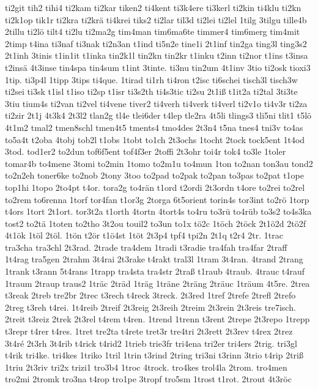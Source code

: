 {ti2git
tih2
tihi4
ti2kam
ti2kar
tiken2
ti4kent
ti3k4ere
ti3kerl
ti2kin
ti4klu
ti2kn
ti2k1op
tik1r
ti2kra
ti2krä
ti4krei
tiks2
ti2lar
til3d
ti2lei
ti2lel
1tilg
3tilgu
tille4b
2tillu
ti2lö
tilt4
ti2lu
ti2ma2g
tim4man
tim6ma6te
timmer4
tim6merg
tim4mit
2timp
t4ina
ti3naf
ti3nak
ti2n3an
t1ind
ti5n2e
tine1i
2t1inf
tin2ga
ting3l
ting3s2
2t1inh
3tinis
t1in1it
t1inka
tin2k1l
tin2kn
tin2kr
t1inku
t2inn
ti2nor
t1ins
t3insa
t2insä
4t3inse
tin4spa
tin4sum
t1int
3tinte.
ti3nu
tin2um
4t1inv
3tio
ti2osk
tioxi3
1tip.
ti3p4l
1tipp
3tips
ti4que.
1tirad
ti1rh
ti4ron
t2isc
ti6schei
tisch3l
tisch3w
ti2sei
ti3sk
t1isl
t1iso
ti2sp
t1isr
ti3s2th
ti4s3tic
ti2su
2t1iß
t1it2a
ti2tal
3ti3te
3tiu
tium4s
ti2van
ti2vel
ti4vene
tiver2
ti4verh
ti4verk
ti4verl
ti2v1o
ti4v3r
ti2za
ti2zir
2t1j
4t3k4
2t3l2
tlan2g
tl4e
tlei6der
t4lep
tle2ra
4t5li
tlings3
tli5ni
tlit1
t5lö
4t1m2
tmal2
tmen8schl
tmen4t5
tments4
tmo4des
2t3n4
t5na
tnes4
tni3v
to4as
to5a4t
t2oba
4tobj
tob2l
t1obs
1tobt
to1ch
2t3ochs
1tocht
2tock
tock5ent
1t4od
3tod.
tod1er2
to2dun
tof6f5ent
tof4f3er
2toffi
2t3ohr
toi4r
tok4
to3le
1toler
tomar4b
to4mene
3tomi
to2min
1tomo
to2m1u
to4mun
1ton
to2nan
ton3au
tond2
to2n2eh
toner6ke
to2nob
2tony
3too
to2pad
to2pak
to2pan
to3pas
to2pat
t1ope
top1hi
1topo
2to4pt
t4or.
tora2g
to4rän
t1ord
t2ordi
2t3ordn
t4ore
to2rei
to2rel
to2rem
to6renna
1torf
tor4fan
t1or3g
2torga
6t5orient
torin4s
tor3int
to2rö
1torp
t4ors
1tort
2t1ort.
tor3t2a
t1orth
4tortn
4tort4s
to4ru
to3rü
to4rüb
to3s2
to4s3ka
tost2
to2tä
1toten
to2tho
3t2ou
touil2
to3un
to1x
tö2c
1töch
2töck
2t1ö2d
2tö2f
4t1ök
1töl
2töl.
1tön
t2ör
t1ö4st
1töt
2t3p4
tpf4
tpi2n
2t1q
t2r4
2tr.
1trac
tra3cha
tra3chl
2t3rad.
2trade
tra4dem
1tradi
t3radie
tra4fah
tra4far
2traff
1t4rag
tra5gen
2trahm
3t4rai
2t3rake
t4rakt
tral3l
1tram
3t4ran.
4trand
2trang
1trank
t3rann
5t4rans
1trapp
tra4sta
tra4str
2traß
t1raub
4traub.
4trauc
t4rauf
1traum
2traup
traus2
1träc
2träd
1träg
1träne
2träng
2träuc
1träum
4t5re.
2trea
t3reak
2treb
tre2br
2trec
t3rech
t4reck
3treck.
2t3red
1tref
2trefe
2trefl
2trefo
2treg
t3reh
t4rei.
1t4reib
2treif
2t3reig
2t3reih
2treim
2t3rein
2t3reis
tre7isch.
2treit
t3reiz
2trek
2t3rel
t4rem
t4ren.
1trend
1trenn
t3rent
2trepe
2t3repo
1trepp
t3repr
t4rer
t4res.
1tret
tre2ta
t4rete
tret3r
tre4tri
2t3rett
2t3rev
t4rex
2trez
3t4ré
2t3rh
3t4rib
t4rick
t4rid2
1trieb
trie3fr
tri4ena
tri2er
tri4ers
2trig.
tri3gl
t4rik
tri4ke.
tri4kes
1triko
1tril
1trin
t3rind
2tring
tri3ni
t3rinn
3trio
t4rip
2triß
1triu
2t3riv
tri2x
trizi1
tro3b4
1troc
4trock.
tro4kes
trol4la
2trom.
tro4men
tro2mi
2tromk
tro3na
t4rop
tro1pe
3tropf
tro5sm
1trost
t1rot.
2trout
4t3röc
}

